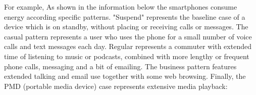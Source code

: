 \documentclass[conference]{IEEEtran}
\begin{document}
 For example, As shown in the information below \cite{CarrollAnalysis} the smartphones consume energy according specific patterns. 
 "Suspend" represents the baseline case of a device which is on standby, without placing or receiving calls or messages. The casual pattern represents a user who uses the phone for a small number of voice calls and text messages each day. Regular represents a commuter with extended time of listening to music or podcasts, combined with more lengthy or frequent phone calls, messaging and a bit of emailing. The business pattern features extended talking and email use together with some web browsing. Finally, the PMD (portable media device) case represents extensive media playback:

\begin{table}[h]
\caption {Usage patterns, showing total time for each activity in minutes \cite{CarrollAnalysis}.}
\end{table}
  
\end{document}
